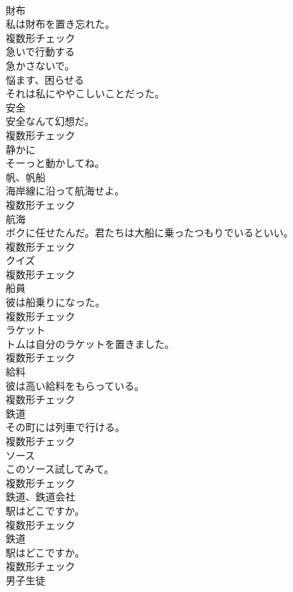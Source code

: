 \documentclass[8pt]{extreport}
\begin{document}
\begin{CJK}{UTF8}{min}
\\	[名詞]	財布	
\\	私は財布を置き忘れた。	
\\	複数形チェック
\\	[動詞]	急いで行動する	
\\	急かさないで。	
\\	[動詞]	悩ます、困らせる	
\\	それは私にややこしいことだった。	
\\	[名詞]	安全	
\\	安全なんて幻想だ。	
\\	複数形チェック
\\	[副詞]	静かに	
\\	そーっと動かしてね。	
\\	[名詞]	帆、帆船	
\\	海岸線に沿って航海せよ。	
\\	複数形チェック
\\	[名詞]	航海	
\\	ボクに任せたんだ。君たちは大船に乗ったつもりでいるといい。	
\\	複数形チェック
\\	[名詞]	クイズ	
\\	複数形チェック
\\	[名詞]	船員	
\\	彼は船乗りになった。	
\\	複数形チェック
\\	[名詞]	ラケット	
\\	トムは自分のラケットを置きました。	
\\	複数形チェック
\\	[名詞]	給料	
\\	彼は高い給料をもらっている。	
\\	複数形チェック
\\	[名詞]	鉄道	
\\	その町には列車で行ける。	
\\	複数形チェック
\\	[名詞]	ソース	
\\	このソース試してみて。	
\\	複数形チェック
\\	[名詞]	鉄道、鉄道会社	
\\	駅はどこですか。	
\\	複数形チェック
\\	[名詞]	鉄道	
\\	駅はどこですか。	
\\	複数形チェック
\\	[名詞]	男子生徒	

\end{CJK}
\end{document}
